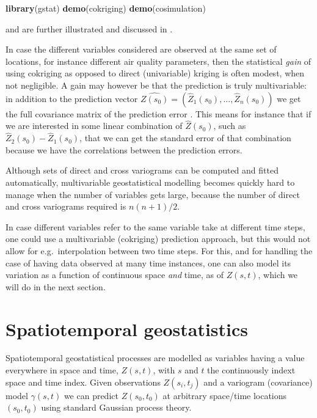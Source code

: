 \documentclass[]{book}
\newenvironment{Shaded}{\begin{snugshade}}{\end{snugshade}}
\newcommand{\KeywordTok}[1]{\textcolor[rgb]{0.13,0.29,0.53}{\textbf{#1}}}
\newcommand{\NormalTok}[1]{#1}
\begin{document}
\begin{Shaded}
\begin{Highlighting}[]
\KeywordTok{library}\NormalTok{(gstat)}
\KeywordTok{demo}\NormalTok{(cokriging)}
\KeywordTok{demo}\NormalTok{(cosimulation)}
\end{Highlighting}
\end{Shaded}

and are further illustrated and discussed in \citep{asdar}.

In case the different variables considered are observed at
the same set of locations, for instance different air quality
parameters, then the statistical \emph{gain} of using cokriging
as opposed to direct (univariable) kriging is often modest,
when not negligible. A gain may however be that the prediction
is truly multivariable: in addition to the prediction vector
\(\hat{Z(s_0)}=(\hat{Z}_1(s_0),...,\hat{Z}_n(s_0))\) we get the full
covariance matrix of the prediction error \citep{ver1993multivariable}.
This means for instance that if we are interested in some
linear combination of \(\hat{Z}(s_0)\), such as \(\hat{Z}_2(s_0) - \hat{Z}_1(s_0)\), that we can get the standard error of that
combination because we have the correlations between the prediction
errors.

Although sets of direct and cross variograms can be computed
and fitted automatically, multivariable geostatistical modelling
becomes quickly hard to manage when the number of variables gets
large, because the number of direct and cross variograms required
is \(n(n+1)/2\).

In case different variables refer to the same variable take at
different time steps, one could use a multivariable (cokriging)
prediction approach, but this would not allow for e.g.~interpolation
between two time steps. For this, and for handling the case of
having data observed at many time instances, one can also model
its variation as a function of continuous space \emph{and} time, as of
\(Z(s,t)\), which we will do in the next section.

\hypertarget{spatiotemporal-geostatistics}{%
\section{Spatiotemporal geostatistics}\label{spatiotemporal-geostatistics}}

Spatiotemporal geostatistical processes are modelled as variables
having a value everywhere in space and time, \(Z(s,t)\), with \(s\) and
\(t\) the continuously indext space and time index. Given observations
\(Z(s_i,t_j)\) and a variogram (covariance) model \(\gamma(s,t)\) we can
predict \(Z(s_0,t_0)\) at arbitrary space/time locations \((s_0,t_0)\)
using standard Gaussian process theory.
\end{document}
